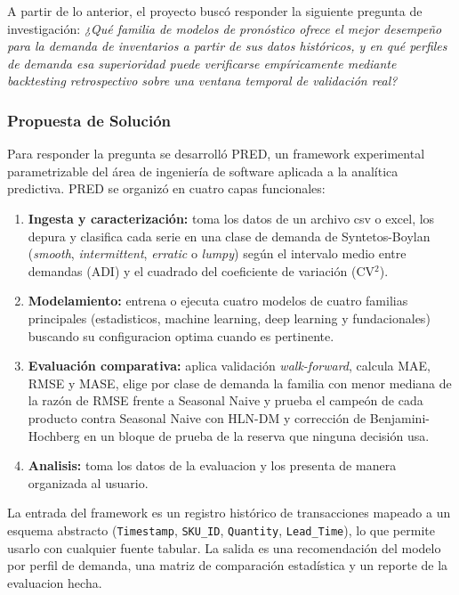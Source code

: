 A partir de lo anterior, el proyecto buscó responder la siguiente pregunta de investigación: \textit{¿Qué familia de modelos de pronóstico ofrece el mejor desempeño para la demanda de inventarios a partir de sus datos históricos, y en qué perfiles de demanda esa superioridad puede verificarse empíricamente mediante backtesting retrospectivo sobre una ventana temporal de validación real?}


\subsubsection{Propuesta de Solución}
Para responder la pregunta se desarrolló PRED, un framework experimental parametrizable del área de ingeniería de software aplicada a la analítica predictiva. PRED se organizó en cuatro capas funcionales:
\begin{enumerate}
    \item \textbf{Ingesta y caracterización:} toma los datos de un archivo csv o excel, los depura y clasifica cada serie en una clase de demanda de Syntetos-Boylan (\textit{smooth}, \textit{intermittent}, \textit{erratic} o \textit{lumpy}) según el intervalo medio entre demandas (ADI) y el cuadrado del coeficiente de variación (CV$^2$).
    \item \textbf{Modelamiento:} entrena o ejecuta cuatro modelos de cuatro familias principales (estadisticos, machine learning, deep learning y fundacionales) buscando su configuracion optima cuando es pertinente.
    \item \textbf{Evaluación comparativa:} aplica validación \textit{walk-forward}, calcula MAE, RMSE y MASE, elige por clase de demanda la familia con menor mediana de la razón de RMSE frente a Seasonal Naive y prueba el campeón de cada producto contra Seasonal Naive con HLN-DM y corrección de Benjamini-Hochberg en un bloque de prueba de la reserva que ninguna decisión usa.
    \item \textbf{Analisis:} toma los datos de la evaluacion y los presenta de manera organizada al usuario.
\end{enumerate}
La entrada del framework es un registro histórico de transacciones mapeado a un esquema abstracto (\texttt{Timestamp}, \texttt{SKU\_ID}, \texttt{Quantity}, \texttt{Lead\_Time}), lo que permite usarlo con cualquier fuente tabular. La salida es una recomendación del modelo por perfil de demanda, una matriz de comparación estadística y un reporte de la evaluacion hecha.


